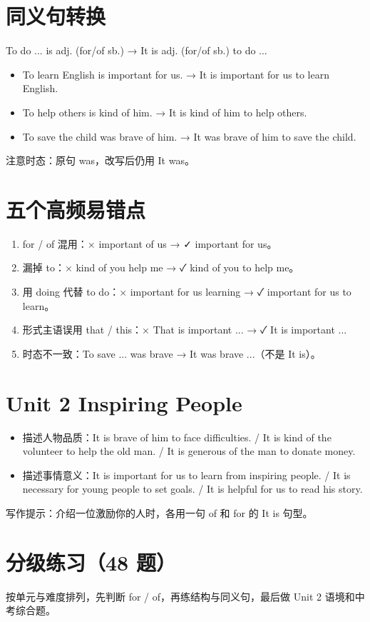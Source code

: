 \documentclass[11pt,a4paper]{ctexart}
\begin{document}
\section{同义句转换}
To do ... is adj. (for/of sb.) → It is adj. (for/of sb.) to do ...
\begin{itemize}[leftmargin=1.4em]
\item To learn English is important for us. → It is important for us to learn English.
\item To help others is kind of him. → It is kind of him to help others.
\item To save the child was brave of him. → It was brave of him to save the child.
\end{itemize}
注意时态：原句 was，改写后仍用 It was。

\section{五个高频易错点}
\begin{enumerate}[leftmargin=1.4em]
\item for / of 混用：× important of us → ✓ important for us。
\item 漏掉 to：× kind of you help me → ✓ kind of you to help me。
\item 用 doing 代替 to do：× important for us learning → ✓ important for us to learn。
\item 形式主语误用 that / this：× That is important ... → ✓ It is important ...
\item 时态不一致：To save ... was brave → It was brave ...（不是 It is）。
\end{enumerate}

\section{Unit 2 Inspiring People}
\begin{itemize}[leftmargin=1.4em]
\item 描述人物品质：It is brave of him to face difficulties. / It is kind of the volunteer to help the old man. / It is generous of the man to donate money.
\item 描述事情意义：It is important for us to learn from inspiring people. / It is necessary for young people to set goals. / It is helpful for us to read his story.
\end{itemize}
写作提示：介绍一位激励你的人时，各用一句 of 和 for 的 It is 句型。

\newpage
\section{分级练习（48 题）}
\noindent 按单元与难度排列，先判断 for / of，再练结构与同义句，最后做 Unit 2 语境和中考综合题。
\end{document}
